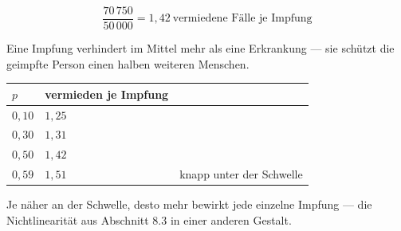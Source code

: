 \begin{aufgabe}
\[ \frac{70\,750}{50\,000} = 1{,}42 \ \text{vermiedene Fälle je Impfung} \]

Eine Impfung verhindert im Mittel mehr als eine Erkrankung --- sie schützt die geimpfte Person  einen halben weiteren Menschen.

\begin{center}
\begin{minipage}{0.88\textwidth}
\end{minipage}
\end{center}

\begin{center}
\renewcommand{\arraystretch}{1.45}
\begin{tabular}{@{}P{1.8cm}P{2.6cm}P{2.6cm}@{}}
\toprule
$p$ & \textbf{vermieden je Impfung} & \\
\midrule
$0{,}10$ & $1{,}25$ & \\
$0{,}30$ & $1{,}31$ & \\
$0{,}50$ & $1{,}42$ & \\
$0{,}59$ & $1{,}51$ & \textcolor{gruen}{knapp unter der Schwelle}\\
\bottomrule
\end{tabular}
\end{center}

Je näher an der Schwelle, desto mehr bewirkt jede einzelne Impfung --- die Nichtlinearität aus Abschnitt 8.3 in einer anderen Gestalt.
\end{aufgabe}

